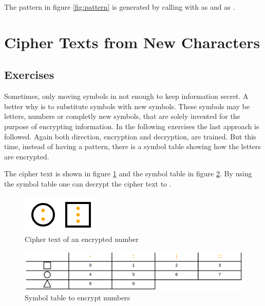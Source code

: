 \begin{example}
  The pattern in figure \ref{fig:pattern} is generated by calling  with  as  and \code{[[0, 4], [1, 2]]} as .
\end{example}

\section{Cipher Texts from New Characters}
\label{section:symbols}

\subsection{Exercises}
Sometimes, only moving symbols in not enough to keep information secret. A better why is to substitute symbols with new symbols. These symbols may be letters, numbers or completly new symbols, that are solely invented for the purpose of encrypting information.
In the following exercises the last approach is followed. Again both direction, encryption and decryption, are trained. But this time, instead of having a pattern, there is a symbol table showing how the letters are encrypted. 

\begin{example}
    The cipher text is shown in figure \ref{fig:cipher_number} and the symbol table in figure \ref{fig:symboltable_numbers}. By using the symbol table one can decrypt the cipher text to .
\end{example}

\begin{figure} 
    \centering
    \includegraphics[width=0.2 \columnwidth]{figures/cipher_number.png}
    \caption{Cipher text of an encrypted number} 
    \label{fig:cipher_number} 
\end{figure}

\begin{figure} 
    \centering
    \includegraphics[width=1.0 \columnwidth]{figures/symboltable_numbers.png}
    \caption{Symbol table to encrypt numbers} 
    \label{fig:symboltable_numbers} 
\end{figure}

